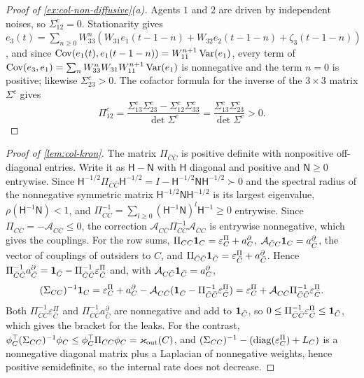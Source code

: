 \begin{proof}[Proof of \cref{ex:col-non-diffusive}(a)]
Agents $1$ and $2$ are driven by independent noises, so $\Sigma^c_{12}=0$. Stationarity gives $e_3(t)=\sum_{n\ge0}W_{33}^n(W_{31}e_1(t-1-n)+W_{32}e_2(t-1-n)+\zeta_3(t-1-n))$, and since $\operatorname{Cov}(e_1(t),e_1(t-1-n))=W_{11}^{n+1}\operatorname{Var}(e_1)$, every term of $\operatorname{Cov}(e_3,e_1)=\sum_nW_{33}^nW_{31}W_{11}^{n+1}\operatorname{Var}(e_1)$ is nonnegative and the term $n=0$ is positive; likewise $\Sigma^c_{23}>0$. The cofactor formula for the inverse of the $3\times3$ matrix $\Sigma^c$ gives
\[
\Pi^c_{12}=\frac{\Sigma^c_{13}\Sigma^c_{23}-\Sigma^c_{12}\Sigma^c_{33}}{\det\Sigma^c}=\frac{\Sigma^c_{13}\Sigma^c_{23}}{\det\Sigma^c}>0.
\]
\end{proof}

\begin{proof}[Proof of \cref{lem:col-kron}]
The matrix $\Pi_{\bar C\bar C}$ is positive definite with nonpositive off-diagonal entries. Write it as $\mathsf H-\mathsf N$ with $\mathsf H$ diagonal and positive and $\mathsf N\ge0$ entrywise. Since $\mathsf H^{-1/2}\Pi_{\bar C\bar C}\mathsf H^{-1/2}=I-\mathsf H^{-1/2}\mathsf N\mathsf H^{-1/2}\succ0$ and the spectral radius of the nonnegative symmetric matrix $\mathsf H^{-1/2}\mathsf N\mathsf H^{-1/2}$ is its largest eigenvalue, $\rho(\mathsf H^{-1}\mathsf N)<1$, and $\Pi_{\bar C\bar C}^{-1}=\sum_{l\ge0}(\mathsf H^{-1}\mathsf N)^l\mathsf H^{-1}\ge0$ entrywise. Since $\Pi_{C\bar C}=-\mathcal A_{C\bar C}\le0$, the correction $\mathcal A_{C\bar C}\Pi_{\bar C\bar C}^{-1}\mathcal A_{\bar CC}$ is entrywise nonnegative, which gives the couplings. For the row sums, $\Pi_{CC}\mathbf{1}_C=\varepsilon^\Pi_C+a^\partial_C$, $\mathcal A_{\bar CC}\mathbf{1}_C=a^\partial_{\bar C}$, the vector of couplings of outsiders to $C$, and $\Pi_{\bar C\bar C}\mathbf{1}_{\bar C}=\varepsilon^\Pi_{\bar C}+a^\partial_{\bar C}$. Hence $\Pi_{\bar C\bar C}^{-1}a^\partial_{\bar C}=\mathbf{1}_{\bar C}-\Pi_{\bar C\bar C}^{-1}\varepsilon^\Pi_{\bar C}$ and, with $\mathcal A_{C\bar C}\mathbf{1}_{\bar C}=a^\partial_C$,
\[
(\Sigma_{CC})^{-1}\mathbf{1}_C=\varepsilon^\Pi_C+a^\partial_C-\mathcal A_{C\bar C}(\mathbf{1}_{\bar C}-\Pi_{\bar C\bar C}^{-1}\varepsilon^\Pi_{\bar C})=\varepsilon^\Pi_C+\mathcal A_{C\bar C}\Pi_{\bar C\bar C}^{-1}\varepsilon^\Pi_{\bar C}.
\]
Both $\Pi_{\bar C\bar C}^{-1}\varepsilon^\Pi_{\bar C}$ and $\Pi_{\bar C\bar C}^{-1}a^\partial_{\bar C}$ are nonnegative and add to $\mathbf{1}_{\bar C}$, so $0\le\Pi_{\bar C\bar C}^{-1}\varepsilon^\Pi_{\bar C}\le\mathbf{1}_{\bar C}$, which gives the bracket for the leaks. For the contrast, $\phi_C^\top(\Sigma_{CC})^{-1}\phi_C\le\phi_C^\top\Pi_{CC}\phi_C=\varkappa_{\mathrm{out}}(C)$, and $(\Sigma_{CC})^{-1}-(\operatorname{diag}(\varepsilon^\Pi_C)+L_C)$ is a nonnegative diagonal matrix plus a Laplacian of nonnegative weights, hence positive semidefinite, so the internal rate does not decrease.
\end{proof}

